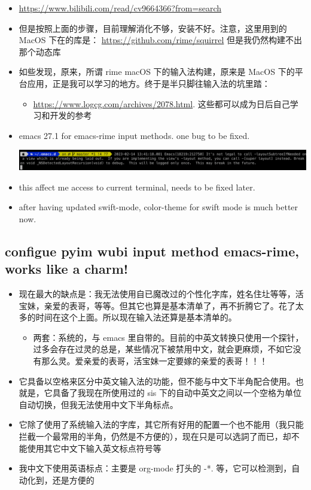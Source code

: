 \documentclass[9pt, b5paper]{article}
\begin{document}
\begin{itemize}
\item \url{https://www.bilibili.com/read/cv9664366?from=search}
\item 但是按照上面的步骤，目前理解消化不够，安装不好。注意，这里用到的 MacOS 下在的库是： \url{https://github.com/rime/squirrel} 但是我仍然构建不出那个动态库
\item 如些发现，原来，所谓 rime macOS 下的输入法构建，原来是 MacOS 下的平台应用，正是我可以学习的地方。终于是半只脚往输入法的坑里踏：
\begin{itemize}
\item \url{https://www.logcg.com/archives/2078.html}. 这些都可以成为日后自己学习和开发的参考
\end{itemize}

\item emacs 27.1 for emacs-rime input methods. one bug to be fixed. 

\includegraphics[width=.9\linewidth]{./pic/readme_20230214_134351.png}
\item this affect me access to current terminal, needs to be fixed later.
\item after having updated swift-mode, color-theme for swift mode is much better now.
\end{itemize}
\subsection{configue pyim wubi input method emacs-rime, works like a charm!}
\label{sec-2-1}
\begin{itemize}
\item 现在最大的缺点是：我无法使用自已魔改过的个性化字库，姓名住圵等等，活宝妹，亲爱的表哥，等等。但其它也算是基本清单了，再不折腾它了。花了太多的时间在这个上面。所以现在输入法还算是基本清单的。
\begin{itemize}
\item 两套：系统的，与 emacs 里自带的。目前的中英文转换只使用一个探针，过多会存在过灵的总是，某些情况下被禁用中文，就会更麻烦，不如它没有那么灵。爱亲爱的表哥，活宝妹一定要嫁的亲爱的表哥！！！
\end{itemize}
\item 它具备以空格来区分中英文输入法的功能，但不能与中文下半角配合使用。也就是，它具备了我现在所使用过的 sis 下的自动中英文之间以一个空格为单位自动切换，但我无法使用中文下半角标点。
\item 它除了使用了系统输入法的字库，其它所有好用的配置一个也不能用（我只能拦截一个最常用的半角，仍然是不方便的），现在只是可以选詞了而已，却不能使用其它中文下输入英文标点符号等
\item 我中文下使用英语标点：主要是 org-mode 打头的 -*. 等，它可以检测到，自动化到，还是方便的
\end{itemize}
\end{document}
